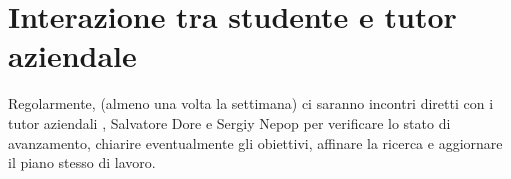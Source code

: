 \section*{Interazione tra studente e tutor aziendale}


Regolarmente, (almeno una volta la settimana) ci saranno incontri diretti con i tutor aziendali \nomeTutorAziendale \cognomeTutorAziendale, Salvatore Dore e Sergiy Nepop per verificare lo stato di avanzamento, chiarire eventualmente gli obiettivi, affinare la ricerca e aggiornare il piano stesso di lavoro.
